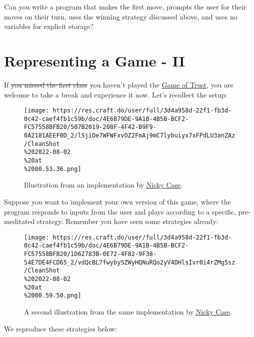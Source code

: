 \documentclass[
  letterpaper,
  DIV=11,
  numbers=noendperiod]{scrreprt}
\begin{document}
Can you write a program that makes the first move, prompts the user for
their moves on their turn, uses the winning strategy discussed above,
and uses no variables for explicit storage?

\hypertarget{representing-a-game---ii}{%
\section{Representing a Game - II}\label{representing-a-game---ii}}

If \sout{you missed the first class} you haven't played the
\href{https://ncase.me/trust/}{Game of Trust}, you are welcome to take a
break and experience it now. Let's recollect the setup:

\begin{figure}

{\centering \texttt{[image: https://res.craft.do/user/full/3d4a958d-22f1-fb3d-0c42-caef4fb1c59b/doc/4E6B79DE-9A1B-4B5B-BCF2-FC57558BFB20/507B2019-208F-4F42-B9F9-0A2181AEEF0D\_2/lSjiOe7WFWFxvOZ2FmAj9mC7lybuiyx7xFPdLU3anZAz/CleanShot\\\%202022-08-02\\\%20at\\\%2000.53.36.png]}

}

\caption{Illustration from an implementation by
\href{https://ncase.me/trust/}{Nicky Case}.}

\end{figure}

Suppose you want to implement your own version of this game, where the
program responds to inputs from the user and plays according to a
specific, pre-meditated strategy. Remember you have seen some strategies
already:

\begin{figure}

{\centering \texttt{[image: https://res.craft.do/user/full/3d4a958d-22f1-fb3d-0c42-caef4fb1c59b/doc/4E6B79DE-9A1B-4B5B-BCF2-FC57558BFB20/1D62783B-0E72-4F82-9F38-54E7DE4FCD65\_2/vdQcBL7fwybySZWyHQNuRQo2yV4DHlsIvr0i4rZMg5sz/CleanShot\\\%202022-08-02\\\%20at\\\%2000.59.50.png]}

}

\caption{A second illustration from the same implementation by
\href{https://ncase.me/trust/}{Nicky Case}.}

\end{figure}

We reproduce these strategies below:
\end{document}
